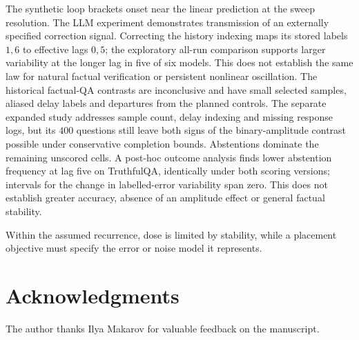 \documentclass[11pt]{article}
\theoremstyle{definition}
\begin{document}
The synthetic loop brackets onset near the linear prediction at the sweep resolution. The LLM
experiment demonstrates transmission of an externally specified correction signal. Correcting the
history indexing maps its stored labels $1,6$ to effective lags $0,5$; the exploratory all-run
comparison supports larger variability at the longer lag in five of six models. This does not
establish the same law for natural factual verification or persistent nonlinear oscillation.
The historical factual-QA contrasts are inconclusive and have small selected samples, aliased
delay labels and departures from the planned controls. The separate expanded study addresses
sample count, delay indexing and missing response logs, but its $400$ questions still leave both
signs of the binary-amplitude contrast possible under conservative completion bounds. Abstentions
dominate the remaining unscored cells. A post-hoc outcome analysis finds lower abstention frequency
at lag five on TruthfulQA, identically under both scoring versions; intervals for the change in
labelled-error variability span zero. This does not establish greater accuracy, absence of an
amplitude effect or general factual stability.

Within the assumed recurrence, dose is limited by stability,
while a placement objective must specify the error or noise model it represents.

\section*{Acknowledgments}
The author thanks Ilya Makarov for valuable feedback on the manuscript.
\end{document}
